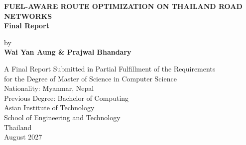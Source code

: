 \documentclass[12pt, a4paper, oneside]{report}
\theoremstyle{definition}
\theoremstyle{remark}
\begin{document}
\hypersetup{pageanchor=false}
\begin{titlepage}
    \centering
    \vspace*{2cm}
    {\Large\bfseries FUEL-AWARE ROUTE OPTIMIZATION ON THAILAND ROAD NETWORKS\\[0.5em]
    \large Final Report\par}
    \vspace{2cm}
    {\large by\\[0.5em]
    \textbf{Wai Yan Aung \& Prajwal Bhandary}\par}
    \vspace{1.5cm}
    {\normalsize
    A Final Report Submitted in Partial Fulfillment of the Requirements\\
    for the Degree of Master of Science in Computer Science\\[1em]
    Nationality: Myanmar, Nepal\\
    Previous Degree: Bachelor of Computing\\[1em]
    Asian Institute of Technology\\
    School of Engineering and Technology\\
    Thailand\\[1em]
    August 2027\par}
    \vfill
\end{titlepage}
\hypersetup{pageanchor=true}
\end{document}
